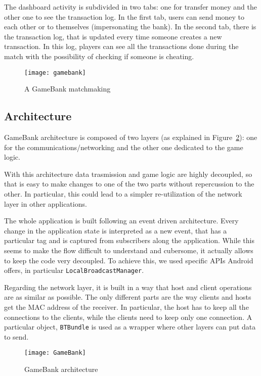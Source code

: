 The dashboard activity is subdivided in two tabs: one for transfer money and 
the other one to see the transaction log. In the first tab, users can send 
money to each other or to themselves (impersonating the bank). In the second 
tab, there is the transaction log, that is updated every time someone creates a 
new transaction. In this log, players can see all the transactions done 
during the match with the possibility of checking if someone is cheating. 

\begin{figure}[t]
 \centering
 \texttt{[image: gamebank]}
 \caption{A GameBank matchmaking}
 \label{fig:gamebank}
\end{figure}



\subsection{Architecture}

GameBank architecture is composed of two layers (as 
explained in Figure~\ref{fig:gbArchitecture}): one for the 
communications/networking and the other one dedicated to the game logic. 

With this architecture data trasmission and game logic are highly decoupled, so 
that is easy to make changes to one of the two parts without repercussion to 
the other. In particular, this could lead to a simpler re-utilization of the 
network layer in other applications.

The whole application is built following an event driven architecture. Every 
change in the application state is interpreted as a new event, that has a 
particular tag and is captured from subscribers along the application. While 
this seems to make the flow difficult to understand and cubersome, it actually 
allows to keep the code very decoupled. To achieve this, we used specific APIs 
Android offers, in particular \texttt{LocalBroadcastManager}.

Regarding the network layer, it is built in a way that host and client 
operations are as similar as possible. The only different parts are the way 
clients and hosts get the MAC address of the receiver. In particular, the host 
has to keep all the connections to the clients, while the clients need to keep  
only one connection. A particular object, \texttt{BTBundle} is used as a wrapper 
where other layers can put data to send.

\begin{figure}[t]
 \centering
 \texttt{[image: GameBank]}
 \caption{GameBank architecture}
 \label{fig:gbArchitecture}
\end{figure}

